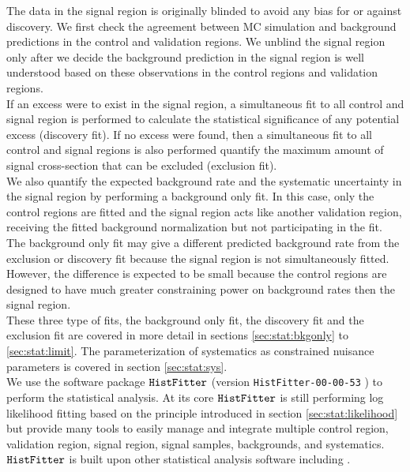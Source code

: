 \indent The data in the signal region is originally blinded to avoid any bias for or against discovery.  We first check the agreement between MC simulation and background predictions in the control and validation regions.  We unblind the signal region only after we decide the background prediction in the signal region is well understood based on these observations in the control regions and validation regions. \\

\indent If an excess were to exist in the signal region, a simultaneous fit to all control and signal region is performed to calculate the statistical significance of any potential excess (discovery fit).   If no excess were found, then a simultaneous fit to all control and signal regions is also performed quantify the maximum amount of signal cross-section that can be excluded (exclusion fit).  \\

\indent We also quantify the expected background rate and the systematic uncertainty in the signal region by performing a background only fit.  In this case, only the control regions are fitted and the signal region acts like another validation region, receiving the fitted background normalization but not participating in the fit.  The background only fit may give a different predicted background rate from the exclusion or discovery fit because the signal region is not simultaneously fitted.  However, the difference is expected to be small because the control regions are designed to have much greater constraining power on background rates then the signal region.  \\

\indent These three type of fits, the background only fit, the discovery fit and the exclusion fit are covered in more detail in sections \ref{sec:stat:bkgonly} to \ref{sec:stat:limit}. The parameterization of systematics as constrained nuisance parameters is covered in section \ref{sec:stat:sys}. \\

\indent We use the software package ${\tt HistFitter}$ (version {\tt HistFitter-00-00-53} ) to perform the statistical analysis.\cite{HistFitter}  At its core ${\tt HistFitter}$ is still performing log likelihood fitting based on the principle introduced in section \ref{sec:stat:likelihood} but \HistFitter provide many tools to easily manage and integrate multiple control region, validation region, signal region, signal samples, backgrounds, and systematics.  ${\tt HistFitter}$ is built upon other statistical analysis software including \RooFit.\cite{RooFit}

